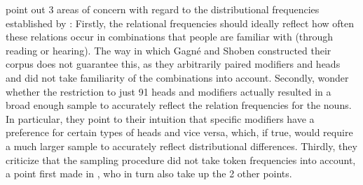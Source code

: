 \citet[854--855]{StormsandWisniewski:2005} point out 3 areas of
concern with regard to the distributional frequencies established by \citet{GagneandShoben:1997}:
Firstly, the relational frequencies should ideally reflect how often
these relations occur in combinations that people are familiar with
(through reading or hearing). The way in which Gagné and Shoben constructed their corpus does not
guarantee this, as they arbitrarily paired modifiers and heads and did
not take familiarity of the combinations into account. Secondly, \citet{StormsandWisniewski:2005} wonder whether
the restriction to just 91 heads and modifiers actually resulted
in a broad enough sample to accurately reflect the relation
frequencies for the nouns. In particular, they point to their
intuition that specific modifiers have a preference for certain types
of heads and vice versa, which, if true, would require a much larger
sample to accurately reflect distributional differences. Thirdly, they
criticize that the sampling procedure did not take token frequencies
into account, a point first made in \citet{WisniewskiandMurphy:2005},
who in turn also take up the 2 other points. 

